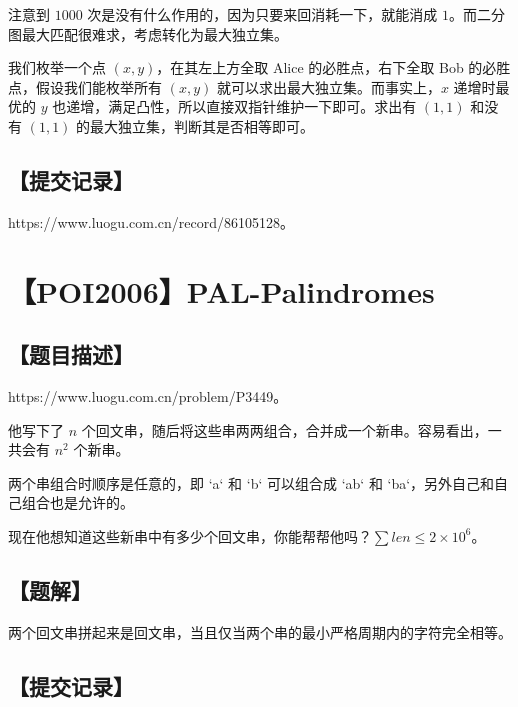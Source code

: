 \documentclass[UTF8,12pt,a4paper]{ctexart}
\begin{document}
	注意到 $1000$ 次是没有什么作用的，因为只要来回消耗一下，就能消成 $1$。而二分图最大匹配很难求，考虑转化为最大独立集。
	
	我们枚举一个点 $(x,y)$，在其左上方全取 Alice 的必胜点，右下全取 Bob 的必胜点，假设我们能枚举所有 $(x,y)$ 就可以求出最大独立集。而事实上，$x$ 递增时最优的 $y$ 也递增，满足凸性，所以直接双指针维护一下即可。求出有 $(1,1)$ 和没有 $(1,1)$ 的最大独立集，判断其是否相等即可。
	
	\subsection*{【提交记录】}
	
	https://www.luogu.com.cn/record/86105128。
	
	
	\section*{【POI2006】PAL-Palindromes}
	
	\subsection*{【题目描述】}
	
	https://www.luogu.com.cn/problem/P3449。
	
	他写下了 $n$ 个回文串，随后将这些串两两组合，合并成一个新串。容易看出，一共会有 $n^2$ 个新串。
	
	两个串组合时顺序是任意的，即 `a` 和 `b` 可以组合成 `ab` 和 `ba`，另外自己和自己组合也是允许的。
	
	现在他想知道这些新串中有多少个回文串，你能帮帮他吗？$\sum len \le 2\times 10^6$。
	
	\subsection*{【题解】}
	
	两个回文串拼起来是回文串，当且仅当两个串的最小严格周期内的字符完全相等。
	
	\subsection*{【提交记录】}
	
\end{document}
